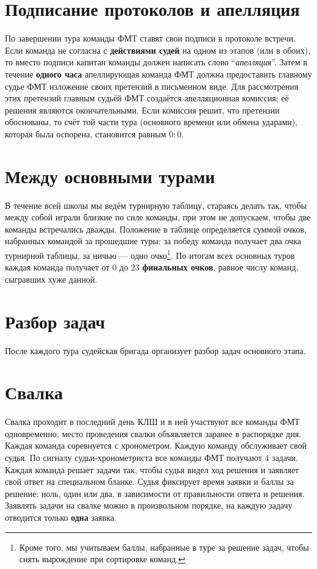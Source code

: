 \documentclass[12pt,a4paper]{article}
\begin{document}
\section{Подписание протоколов и апелляция}
По завершении тура команды ФМТ ставят свои подписи в протоколе встречи. Если команда не согласна с {\bf действиями судей} на одном из этапов (или в обоих), то вместо подписи капитан команды должен написать слово ``\textsl{апелляция}''. Затем в течение {\bf одного часа} апеллирующая команда ФМТ должна предоставить главному судье ФМТ изложение своих претензий в письменном виде. Для рассмотрения этих претензий главным судьёй ФМТ создаётся апелляционная комиссия; её решения являются окончательными. Если комиссия решит, что претензии обоснованы, то счёт той части тура (основного времени или обмена ударами), которая была оспорена, становится равным $0:0$.

\section{Между основными турами}
В течение всей школы мы ведём турнирную таблицу, стараясь делать так, чтобы между собой играли близкие по силе команды, при этом не допускаем, чтобы две команды встречались дважды. Положение в таблице определяется суммой очков, набранных командой за прошедшие туры: за победу команда получает два очка турнирной таблицы, за ничью --- одно очко\footnote{Кроме того, мы учитываем баллы, набранные в туре за решение задач, чтобы снять вырождение при сортировке команд.}. По итогам всех основных туров каждая команда получает от 0 до 23 {\bf финальных очков}, равное числу команд, сыгравших хуже данной.

\section{Разбор задач}
После каждого тура судейская бригада организует разбор задач основного этапа.

\section{Свалка}
Свалка проходит в последний день КЛШ и в ней участвуют все команды ФМТ одновременно; место проведения свалки объявляется заранее в распорядке дня. Каждая команда соревнуется с хронометром. Каждую команду обслуживает свой судья. По сигналу судьи-хронометриста все команды ФМТ получают 4 задачи. Каждая команда решает задачи так, чтобы судья видел ход решения и заявляет свой ответ на специальном бланке. Судья фиксирует время заявки и баллы за решение: ноль, один или два, в зависимости от правильности ответа и решения. Заявлять задачи на свалке можно в произвольном порядке, на каждую задачу отводится только \textbf{одна} заявка.
\end{document}
